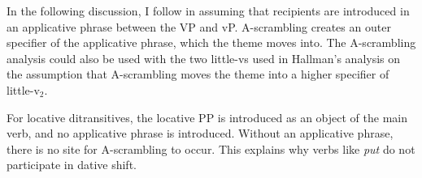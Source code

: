 In the following discussion, I follow \cite{McGinnis.1998} in assuming that recipients are introduced in an applicative phrase between the VP and vP. A-scrambling creates an outer specifier of the applicative phrase, which the theme moves into. The A-scrambling analysis could also be used with the two little-vs used in Hallman's analysis on the assumption that A-scrambling moves the theme into a higher specifier of little-v$_{\text{2}}$.
\begin{exe}
\ex \hfill \break
{}
\end{exe}%
For locative ditransitives, the locative PP is introduced as an object of the main verb, and no applicative phrase is introduced. Without an applicative phrase, there is no site for A-scrambling to occur. This explains why verbs like \textit{put} do not participate in dative shift.
\begin{exe}
\ex \hfill \break
{}
 \end{exe}%
 

